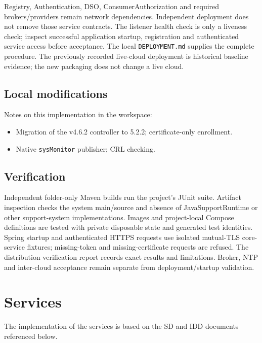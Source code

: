 \documentclass[a4paper]{arrowhead}
\begin{document}
Registry, Authentication, DSO, ConsumerAuthorization and required brokers/providers remain network dependencies. Independent deployment does not remove those service contracts. The listener health check is only a liveness check; inspect successful application startup, registration and authenticated service access before acceptance. The local \texttt{DEPLOYMENT.md} supplies the complete procedure. The previously recorded live-cloud deployment is historical baseline evidence; the new packaging does not change a live cloud.

\subsection{Local modifications}
\label{sec:local}

Notes on this implementation in the workspace:
\begin{itemize}
  \item Migration of the v4.6.2 controller to 5.2.2; certificate-only enrollment.
  \item Native \texttt{sysMonitor} publisher; CRL checking.
\end{itemize}

\subsection{Verification}

Independent folder-only Maven builds run the project's JUnit suite. Artifact inspection checks the system main/source and absence of JavaSupportRuntime or other support-system implementations. Images and project-local Compose definitions are tested with private disposable state and generated test identities. Spring startup and authenticated HTTPS requests use isolated mutual-TLS core-service fixtures; missing-token and missing-certificate requests are refused. The distribution verification report records exact results and limitations. Broker, NTP and inter-cloud acceptance remain separate from deployment/startup validation.

\newpage

\section{Services}
\label{sec:services}

The implementation of the services is based on the SD and IDD documents referenced below.
\end{document}
